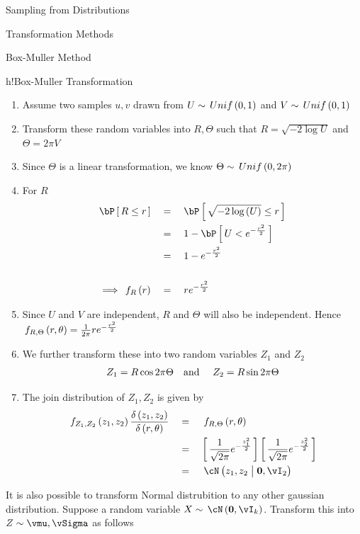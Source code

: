 \documentclass{article}
\begin{document}
\begin{ssection}{Sampling from Distributions}
\begin{ssubsection}{Transformation Methods}
\begin{sssubsection}{Box-Muller Method}
\begin{algo}{h!}{Box-Muller Transformation}
				\begin{enumerate}
					\item Assume two samples $u, v$ drawn from $U \sim \func{Unif}{0, 1}$ and $V \sim \func{Unif}{0, 1}$
					\item Transform these random variables into $R, \Theta$ such that $R = \sqrt{-2 \log{U}}$ and $\Theta = 2 \pi V$
					\item Since $\Theta$ is a linear transformation, we know $\Theta \sim \func{Unif}{0, 2 \pi}$
					\item For $R$
						\begin{align*}
							\prob{R \le r}			&\eq \prob{\sqrt{-2 \log{U}} \le r} \\
													&\eq 1 - \prob{U < \exp{- \frac{r^2}{2}}} \\
													&\eq 1 - \exp{- \frac{r^2}{2}} \\
							\\
							\implies \func[R]{f}{r}	&\eq r \exp{- \frac{r^2}{2}}
						\end{align*}
					\item Since $U$ and $V$ are independent, $R$ and $\Theta$ will also be independent. Hence $\func[R, \Theta]{f}{r, \theta} = \frac{1}{2 \pi} r \exp{- \frac{r^2}{2}}$
					\item We further transform these into two random variables $Z_1$ and $Z_2$
						\begin{align*}
							Z_1 = R \cos{2 \pi \Theta} && \text{and}\,\, && Z_2 = R \sin{2 \pi \Theta}
						\end{align*}
					\item The join distribution of $Z_1, Z_2$ is given by
						\begin{align*}
							\func[Z_1, Z_2]{f}{z_1, z_2} \derp{z_1, z_2}{r, \theta}	&\eq \func[R, \Theta]{f}{r, \theta} \\
																					&\eq \brac{\frac{1}{\sqrt{2 \pi}} \exp{- \frac{z_1^2}{2}}} \brac{\frac{1}{\sqrt{2 \pi}} \exp{- \frac{z_2^2}{2}}} \\
																					&\eq \ND{z_1, z_2 \pipe \vzero, \vI_{2}}
						\end{align*}
				\end{enumerate}

			\end{algo}

			\clearpage

			It is also possible to transform Normal distrubition to any other gaussian distribution. Suppose a random variable $X \sim \ND{\vzero, \vI_{k}}$. Transform this into $Z \sim{\vmu, \vSigma}$ as follows


\end{sssubsection}
\end{ssubsection}
\end{ssection}
\end{document}
